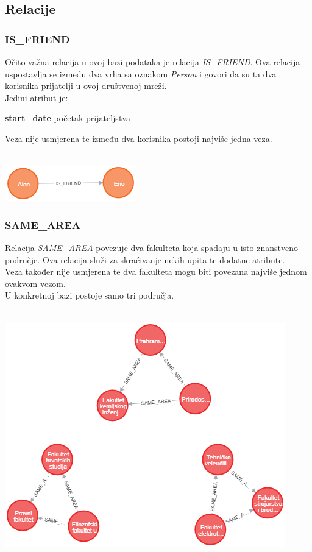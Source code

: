 \documentclass[titlepage, 12pt]{scrartcl}
\begin{document}
\subsection{Relacije}
\subsubsection{IS\_FRIEND}
Očito važna relacija u ovoj bazi podataka je relacija \emph{IS\_FRIEND}. Ova relacija uspostavlja se između dva vrha sa oznakom \emph{Person} i govori da su ta dva korisnika prijatelji u ovoj društvenoj mreži. \\
Jedini atribut je:
\begin{itemize}
\begin{samepage}
    \item \textbf{start\_date} početak prijateljstva
\end{samepage}
\end{itemize}
Veza nije usmjerena te između dva korisnika postoji najviše jedna veza. \\ \\
\begin{center}
    \includegraphics{slike/IS_FRIEND.png}
\end{center}

\subsubsection{SAME\_AREA}
Relacija \emph{SAME\_AREA} povezuje dva fakulteta koja spadaju u isto znanstveno područje. Ova relacija služi za skraćivanje nekih upita te dodatne atribute. \\
Veza također nije usmjerena te dva fakulteta mogu biti povezana najviše jednom ovakvom vezom. \\
U konkretnoj bazi postoje samo tri područja.
\\ \\
\begin{center}
    \includegraphics[scale=0.7]{slike/SAME_AREA.png}    
\end{center}
\end{document}
